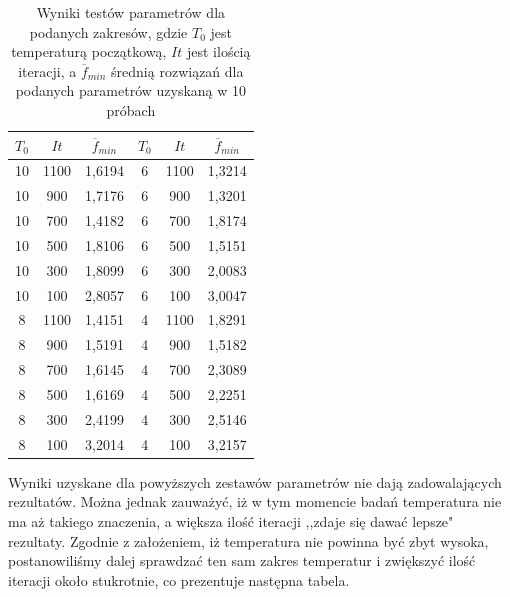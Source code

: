 \documentclass[twoside]{projektInzynierskiMS1}
\newcommand{\si}{ś}
\begin{document}
\begin{table}[htbp]\centering
\def\sym#1{\ifmmode^{#1}\else\(^{#1}\)\fi}
\caption{Wyniki testów parametrów dla podanych zakresów, gdzie $T_0$ jest temperaturą początkową, $It$ jest ilo\si cią iteracji, a $\overline{f}_{min}$ \si rednią rozwiązań dla podanych parametrów uzyskaną w 10 próbach}
\renewcommand\arraystretch{1.333}
\begin{tabular}{|c|c|c||c|c|c|} 
                  \hline
                  $T_0$
                  & $It$
                  & $\overline{f}_{min}$ 
& $T_0$
 & $It$
 & $\overline{f}_{min}$ \\ \hline

10 & 1100 & 1,6194 &6 & 1100 & 1,3214 \\ \hline 
10 & 900 & 1,7176 &6 & 900 & 1,3201 \\ \hline 
10 & 700 & 1,4182&6 & 700 & 1,8174 \\ \hline 
10 & 500 & 1,8106&6 & 500 & 1,5151 \\ \hline 
10 & 300 & 1,8099 &6 & 300 & 2,0083 \\ \hline 
10 & 100 & 2,8057&6 & 100 & 3,0047 \\ \Xhline{3\arrayrulewidth}

8 & 1100 & 1,4151 &4 & 1100 & 1,8291 \\ \hline
8 & 900 & 1,5191 & 4 & 900 & 1,5182 \\ \hline
8 & 700 & 1,6145 &4 & 700 & 2,3089 \\ \hline
8 & 500 & 1,6169 &4 & 500 & 2,2251 \\ \hline
8 & 300 & 2,4199 &4 & 300 & 2,5146 \\ \hline 
8 & 100 & 3,2014 &4 & 100 & 3,2157 \\ \hline 


\end{tabular}
\end{table}


Wyniki uzyskane dla powyższych zestawów parametrów nie dają zadowalających rezultatów. Można jednak zauważyć, iż w tym momencie badań temperatura nie ma aż takiego znaczenia, a większa ilo\si ć iteracji ,,zdaje się dawać lepsze" rezultaty. Zgodnie z założeniem, iż temperatura nie powinna być zbyt wysoka, postanowili\si my dalej sprawdzać ten sam zakres temperatur i zwiększyć ilo\si ć iteracji około stukrotnie, co prezentuje następna tabela.

\clearpage
\end{document}

